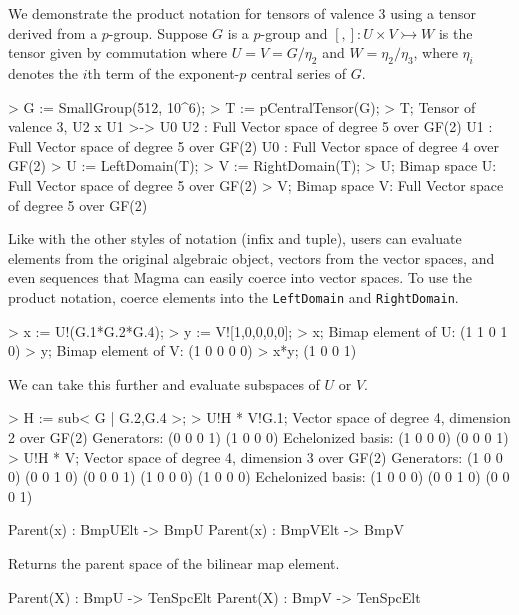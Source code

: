 \begin{example}[BimapProduct]

We demonstrate the product notation for tensors of valence 3 using a tensor derived from a $p$-group. 
Suppose $G$ is a $p$-group and $[,] : U\times V\rightarrowtail W$ is the tensor given by commutation where $U=V=G/\eta_2$ and $W=\eta_2/\eta_3$, where $\eta_i$ denotes the $i$th term of the exponent-$p$ central series of $G$.
\begin{code}
> G := SmallGroup(512, 10^6);
> T := pCentralTensor(G);
> T;
Tensor of valence 3, U2 x U1 >-> U0
U2 : Full Vector space of degree 5 over GF(2)
U1 : Full Vector space of degree 5 over GF(2)
U0 : Full Vector space of degree 4 over GF(2)
> U := LeftDomain(T);
> V := RightDomain(T);
> U;
Bimap space U: Full Vector space of degree 5 over GF(2)
> V;
Bimap space V: Full Vector space of degree 5 over GF(2)
\end{code}

Like with the other styles of notation (infix and tuple), users can evaluate elements from the original algebraic object, vectors from the vector spaces, and even sequences that Magma can easily coerce into vector spaces. 
To use the product notation, coerce elements into the {\tt LeftDomain} and {\tt RightDomain}.

\begin{code}
> x := U!(G.1*G.2*G.4);
> y := V![1,0,0,0,0];
> x;
Bimap element of U: (1 1 0 1 0)
> y;
Bimap element of V: (1 0 0 0 0)
> x*y;
(1 0 0 1)
\end{code}

We can take this further and evaluate subspaces of $U$ or $V$.
\begin{code}
> H := sub< G | G.2,G.4 >;
> U!H * V!G.1;
Vector space of degree 4, dimension 2 over GF(2)
Generators:
(0 0 0 1)
(1 0 0 0)
Echelonized basis:
(1 0 0 0)
(0 0 0 1)
> U!H * V;
Vector space of degree 4, dimension 3 over GF(2)
Generators:
(1 0 0 0)
(0 0 1 0)
(0 0 0 1)
(1 0 0 0)
(1 0 0 0)
Echelonized basis:
(1 0 0 0)
(0 0 1 0)
(0 0 0 1)
\end{code}
\end{example}


\begin{intrinsics}
Parent(x) : BmpUElt -> BmpU
Parent(x) : BmpVElt -> BmpV
\end{intrinsics}

Returns the parent space of the bilinear map element.

\begin{intrinsics}
Parent(X) : BmpU -> TenSpcElt
Parent(X) : BmpV -> TenSpcElt
\end{intrinsics}

